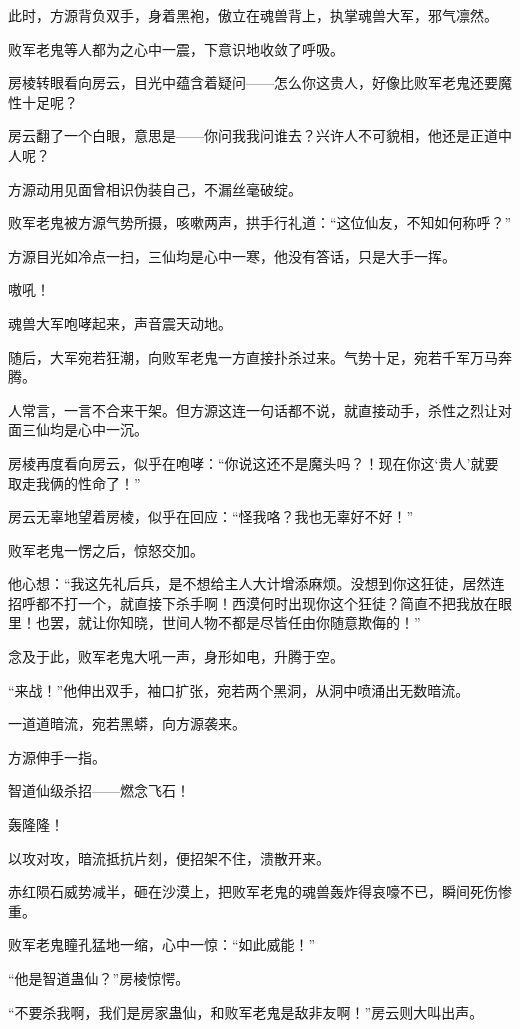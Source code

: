 \begin{this_body}
此时，方源背负双手，身着黑袍，傲立在魂兽背上，执掌魂兽大军，邪气凛然。

败军老鬼等人都为之心中一震，下意识地收敛了呼吸。

房棱转眼看向房云，目光中蕴含着疑问——怎么你这贵人，好像比败军老鬼还要魔性十足呢？

房云翻了一个白眼，意思是——你问我我问谁去？兴许人不可貌相，他还是正道中人呢？

方源动用见面曾相识伪装自己，不漏丝毫破绽。

败军老鬼被方源气势所摄，咳嗽两声，拱手行礼道：“这位仙友，不知如何称呼？”

方源目光如冷点一扫，三仙均是心中一寒，他没有答话，只是大手一挥。

嗷吼！

魂兽大军咆哮起来，声音震天动地。

随后，大军宛若狂潮，向败军老鬼一方直接扑杀过来。气势十足，宛若千军万马奔腾。

人常言，一言不合来干架。但方源这连一句话都不说，就直接动手，杀性之烈让对面三仙均是心中一沉。

房棱再度看向房云，似乎在咆哮：“你说这还不是魔头吗？！现在你这‘贵人’就要取走我俩的性命了！”

房云无辜地望着房棱，似乎在回应：“怪我咯？我也无辜好不好！”

败军老鬼一愣之后，惊怒交加。

他心想：“我这先礼后兵，是不想给主人大计增添麻烦。没想到你这狂徒，居然连招呼都不打一个，就直接下杀手啊！西漠何时出现你这个狂徒？简直不把我放在眼里！也罢，就让你知晓，世间人物不都是尽皆任由你随意欺侮的！”

念及于此，败军老鬼大吼一声，身形如电，升腾于空。

“来战！”他伸出双手，袖口扩张，宛若两个黑洞，从洞中喷涌出无数暗流。

一道道暗流，宛若黑蟒，向方源袭来。

方源伸手一指。

智道仙级杀招——燃念飞石！

轰隆隆！

以攻对攻，暗流抵抗片刻，便招架不住，溃散开来。

赤红陨石威势减半，砸在沙漠上，把败军老鬼的魂兽轰炸得哀嚎不已，瞬间死伤惨重。

败军老鬼瞳孔猛地一缩，心中一惊：“如此威能！”

“他是智道蛊仙？”房棱惊愕。

“不要杀我啊，我们是房家蛊仙，和败军老鬼是敌非友啊！”房云则大叫出声。

\end{this_body}


